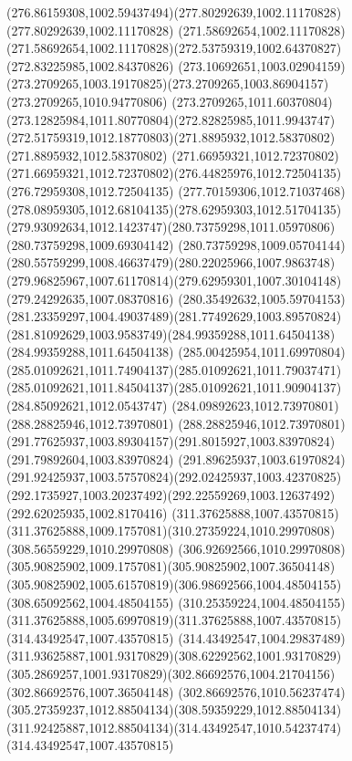 {{	\curveto(276.86159308,1002.59437494)(277.80292639,1002.11170828)(277.80292639,1002.11170828)
	\lineto(271.58692654,1002.11170828)
	\curveto(271.58692654,1002.11170828)(272.53759319,1002.64370827)(272.83225985,1002.84370826)
	\curveto(273.10692651,1003.02904159)(273.2709265,1003.19170825)(273.2709265,1003.86904157)
	\lineto(273.2709265,1010.94770806)
	\curveto(273.2709265,1011.60370804)(273.12825984,1011.80770804)(272.82825985,1011.9943747)
	\curveto(272.51759319,1012.18770803)(271.8895932,1012.58370802)(271.8895932,1012.58370802)
	\lineto(271.66959321,1012.72370802)
	\curveto(271.66959321,1012.72370802)(276.44825976,1012.72504135)(276.72959308,1012.72504135)
	\curveto(277.70159306,1012.71037468)(278.08959305,1012.68104135)(278.62959303,1012.51704135)
	\curveto(279.93092634,1012.1423747)(280.73759298,1011.05970806)(280.73759298,1009.69304142)
	\curveto(280.73759298,1009.05704144)(280.55759299,1008.46637479)(280.22025966,1007.9863748)
	\curveto(279.96825967,1007.61170814)(279.62959301,1007.30104148)(279.24292635,1007.08370816)
	\curveto(280.35492632,1005.59704153)(281.23359297,1004.49037489)(281.77492629,1003.89570824)
	\curveto(281.81092629,1003.9583749)(284.99359288,1011.64504138)(284.99359288,1011.64504138)
	\curveto(285.00425954,1011.69970804)(285.01092621,1011.74904137)(285.01092621,1011.79037471)
	\curveto(285.01092621,1011.84504137)(285.01092621,1011.90904137)(284.85092621,1012.0543747)
	\lineto(284.09892623,1012.73970801)
	\lineto(288.28825946,1012.73970801)
	\curveto(288.28825946,1012.73970801)(291.77625937,1003.89304157)(291.8015927,1003.83970824)
	\lineto(291.79892604,1003.83970824)
	\curveto(291.89625937,1003.61970824)(291.92425937,1003.57570824)(292.02425937,1003.42370825)
	\curveto(292.1735927,1003.20237492)(292.22559269,1003.12637492)(292.62025935,1002.8170416)
	\moveto(311.37625888,1007.43570815)
	\curveto(311.37625888,1009.1757081)(310.27359224,1010.29970808)(308.56559229,1010.29970808)
	\curveto(306.92692566,1010.29970808)(305.90825902,1009.1757081)(305.90825902,1007.36504148)
	\curveto(305.90825902,1005.61570819)(306.98692566,1004.48504155)(308.65092562,1004.48504155)
	\curveto(310.25359224,1004.48504155)(311.37625888,1005.69970819)(311.37625888,1007.43570815)
	\moveto(314.43492547,1007.43570815)
	\curveto(314.43492547,1004.29837489)(311.93625887,1001.93170829)(308.62292562,1001.93170829)
	\curveto(305.2869257,1001.93170829)(302.86692576,1004.21704156)(302.86692576,1007.36504148)
	\curveto(302.86692576,1010.56237474)(305.27359237,1012.88504134)(308.59359229,1012.88504134)
	\curveto(311.92425887,1012.88504134)(314.43492547,1010.54237474)(314.43492547,1007.43570815)
}}
